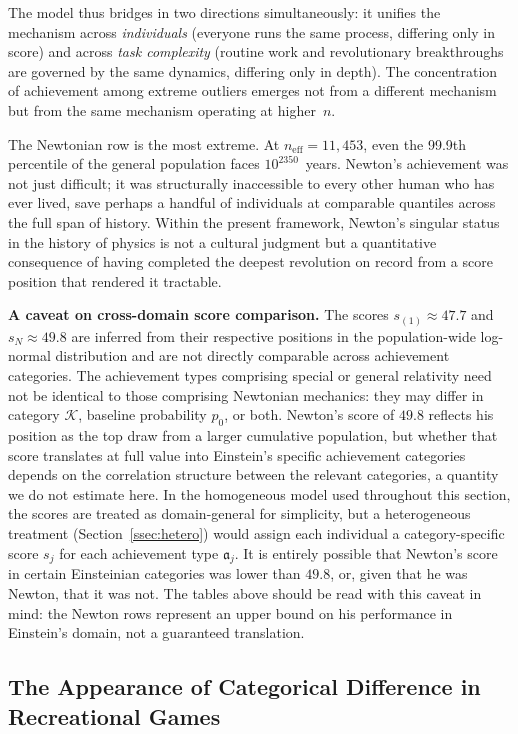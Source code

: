 \documentclass{article}
\begin{document}
The model thus bridges in two directions simultaneously: it unifies the
mechanism across \emph{individuals} (everyone runs the same process,
differing only in score) and across \emph{task complexity} (routine work
and revolutionary breakthroughs are governed by the same dynamics,
differing only in depth). The concentration of achievement among extreme
outliers emerges not from a different mechanism but from the same
mechanism operating at higher~$n$.

The Newtonian row is the most extreme. At $n_{\mathrm{eff}} = 11{,}453$,
even the 99.9th percentile of the general population faces
$10^{2350}$~years. Newton's
achievement was not just difficult; it was structurally inaccessible
to every other human who has ever lived, save perhaps a handful of
individuals at comparable quantiles across the full span of history.
Within the present framework, Newton's singular status in the history
of physics is not a cultural judgment but a quantitative consequence of
having completed the deepest revolution on record from a score position
that rendered it tractable.

\medskip
\noindent\textbf{A caveat on cross-domain score comparison.}\;
The scores $s_{(1)} \approx 47.7$ and $s_N \approx 49.8$ are inferred from
their respective positions in the population-wide log-normal
distribution and are not directly comparable across achievement
categories. The achievement types comprising special or general
relativity need not be identical to those comprising Newtonian mechanics:
they may differ in category $\mathcal{K}$, baseline probability $p_0$,
or both. Newton's score of $49.8$ reflects his position as the top
draw from a larger cumulative population, but whether that score
translates at full value into Einstein's specific achievement categories
depends on the correlation structure between the relevant
categories, a quantity we do not estimate here. In the homogeneous
model used throughout this section, the scores are treated as
domain-general for simplicity, but a heterogeneous treatment
(Section~\ref{ssec:hetero}) would assign each individual a
category-specific score $s_j$ for each achievement type
$\mathfrak{a}_j$. It is entirely possible that Newton's score in
certain Einsteinian categories was lower than $49.8$, or, given that
he was Newton, that it was not. The tables above should be read with
this caveat in mind: the Newton rows represent an upper bound on his
performance in Einstein's domain, not a guaranteed translation.

\subsection{The Appearance of Categorical Difference in Recreational Games}\label{ssec:games}
\end{document}
